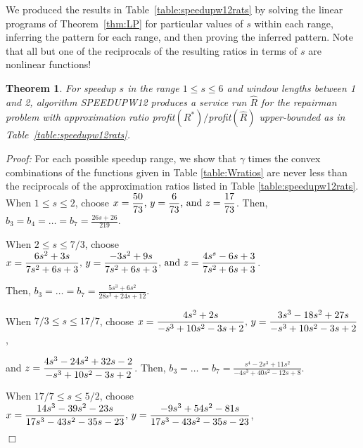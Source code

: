 \documentclass[11pt]{article}
\newtheorem{theorem}{Theorem}[section]
\newcommand\QED{\ifhmode\allowbreak\else\nobreak\fi
\quad\nobreak$\Box$\medbreak}
\newcommand{\proofstart}{\par\noindent \emph{Proof:} }
\newcommand{\proofend}{\QED\par}
\newenvironment{proof}{\proofstart}{\proofend}
\begin{document}
We produced the results in Table~\ref{table:speedupw12rats} by solving the linear programs of Theorem~\ref{thm:LP} for particular values of $s$
within each range, inferring the pattern for each range, and then proving the inferred pattern. 
Note that all but one of the reciprocals of the resulting ratios in terms of $s$ are nonlinear functions!

\begin{theorem}
\label{theorem:1<s<6}
For speedup $s$ in the range $1\leq s \leq 6$
and window lengths between 1 and 2,
algorithm SPEEDUPW12 produces a service run $\hat{R}$ for the repairman problem
with approximation ratio profit$(R^*)/$profit$(\hat{R})$ upper-bounded as in Table~\ref{table:speedupw12rats}.
\end{theorem}

\begin{proof}
For each possible speedup range, we show that $\gamma$ times the convex combinations of the functions given in Table \ref{table:Wratios} are never less than the reciprocals of the approximation ratios listed in Table \ref{table:speedupw12rats}.\\

\noindent When $1 \leq s \leq 2$, choose ${\displaystyle x = {50 \over 73}\mbox{, }y = {6 \over 73}\mbox{, and }z =  {17 \over 73}}$. Then, $b_3 = b_4 = \ldots = b_7 = {\displaystyle \frac{26s + 26}{219}}$.\\\bigskip

\noindent When $2 \leq s \leq 7/3$, choose ${\displaystyle x = {6s^2 + 3s \over 7s^2 + 6s + 3}\mbox{, }y = {-3s^2 + 9s \over 7s^2 + 6s + 3}\mbox{, and }z =  {4s^s - 6s + 3 \over 7s^2 + 6s + 3}}$.\medskip

\noindent Then, $b_3 = \ldots = b_7 = {\displaystyle \frac{5s^3 + 6s^2}{28s^2 + 24s + 12} }$.\\\bigskip

\noindent When $7/3 \leq s \leq 17/7$, choose ${\displaystyle x = {4s^2 + 2s \over -s^3 + 10s^2 - 3s + 2}\mbox{, }y = {3s^3 - 18s^2 + 27s \over -s^3 + 10s^2 - 3s + 2}}$, \medskip 

\noindent and ${\displaystyle z =  {4s^3 - 24s^2 + 32s - 2 \over -s^3 + 10s^2 - 3s + 2}}$.  Then, $b_3 = \ldots = b_7 = {\displaystyle \frac{s^4 - 2s^3 + 11s^2}{-4s^3 + 40s^2 - 12s + 8}}$.\\\bigskip

\noindent When $17/7 \leq s \leq 5/2$, choose ${\displaystyle x = {14s^3 - 39s^2 - 23s \over 17s^3 - 43s^2 - 35s - 23}\mbox{, }y = {-9s^3 + 54s^2 - 81s \over 17s^3 - 43s^2 - 35s - 23}}$,\medskip


\end{proof}
\end{document}
